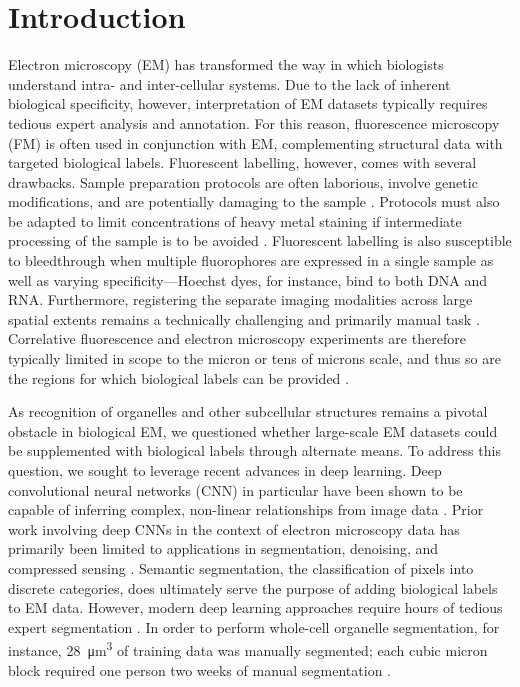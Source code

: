 \section{Introduction}
\label{sec:4.1_intro}

Electron microscopy (EM) has transformed the way in which biologists understand intra- and inter-cellular systems. Due to the lack of inherent biological specificity, however, interpretation of EM datasets typically requires tedious expert analysis and annotation. For this reason, fluorescence microscopy (FM) is often used in conjunction with EM, complementing structural data with targeted biological labels. Fluorescent labelling, however, comes with several drawbacks. Sample preparation protocols are often laborious, involve genetic modifications, and are potentially damaging to the sample \cite{christiansen2018silico, schnell2012immunolabeling}. Protocols must also be adapted to limit concentrations of heavy metal staining if intermediate processing of the sample is to be avoided \cite{kuipers2015scanning, lane2021optimization}. Fluorescent labelling is also susceptible to bleedthrough when multiple fluorophores are expressed in a single sample as well as varying specificity---Hoechst dyes, for instance, bind to both DNA and RNA. Furthermore, registering the separate imaging modalities across large spatial extents remains a technically challenging and primarily manual task \cite{muller2014correlative, paul2017ec, russell20173d}. Correlative fluorescence and electron microscopy experiments are therefore typically limited in scope to the micron or tens of microns scale, and thus so are the regions for which biological labels can be provided \cite{de2015correlated, russell20173d}.

As recognition of organelles and other subcellular structures remains a pivotal obstacle in biological EM, we questioned whether large-scale EM datasets \cite{de2020large, dittmayer2021preparation} could be supplemented with biological labels through alternate means. To address this question, we sought to leverage recent advances in deep learning. Deep convolutional neural networks (CNN) in particular have been shown to be capable of inferring complex, non-linear relationships from image data \cite{he2016deep, januszewski2018high}. Prior work involving deep CNNs in the context of electron microscopy data has primarily been limited to applications in segmentation, denoising, and compressed sensing \cite{ede2021deep}. Semantic segmentation, the classification of pixels into discrete categories, does ultimately serve the purpose of adding biological labels to EM data. However, modern deep learning approaches require hours of tedious expert segmentation \cite{takemura2013visual, helmstaedter2013cellular, huang2014identifying, heinrich2018synaptic, liu2020automatic, spiers2021deep}. In order to perform whole-cell organelle segmentation, for instance, \SI{28}{\micro\meter^3} of training data was manually segmented; each cubic micron block required one person two weeks of manual segmentation \cite{heinrich2020automatic}.

